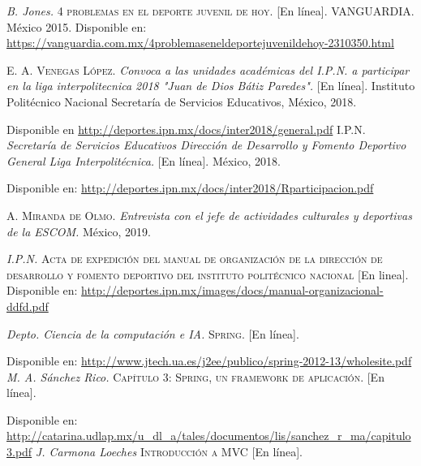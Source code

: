 
\begin{thebibliography}{}
	\textit{B. Jones.}
	\textsc{4 problemas en el deporte juvenil de hoy.} [En línea].
	VANGUARDIA. México 2015.
	\linebreak
	Disponible en: 
	\url{https://vanguardia.com.mx/4problemaseneldeportejuvenildehoy-2310350.html}
	
	\textsc{E. A. Venegas López.}
	\textit{Convoca a las unidades académicas del I.P.N. a participar en la liga interpolitecnica 2018 "Juan de Dios Bátiz Paredes".} [En línea]. Instituto Politécnico Nacional Secretaría de Servicios Educativos, México, 2018.
	
	\linebreak
	Disponible en
	\url{http://deportes.ipn.mx/docs/inter2018/general.pdf}
	\textsc{I.P.N.}
	\textit{Secretaría de Servicios Educativos Dirección de Desarrollo y Fomento Deportivo General Liga Interpolitécnica.}
	[En línea]. México, 2018.
	
	\linebreak
	Disponible en: 
	\url{http://deportes.ipn.mx/docs/inter2018/Rparticipacion.pdf}
	
	\textsc{A. Miranda de Olmo.}
	\textit{Entrevista con el jefe de actividades culturales y deportivas de la ESCOM.} México, 2019.
	
	\linebreak
	
	\textit{I.P.N.}
	\textsc{Acta de expedición del manual de organización de la dirección de desarrollo y fomento deportivo del instituto politécnico nacional} [En linea].
	Disponible en:
	\url{http://deportes.ipn.mx/images/docs/manual-organizacional-ddfd.pdf}
	
	\textit{Depto. Ciencia de la computación e IA.}
	\textsc{Spring.} [En línea]. 
	
	\linebreak
	Disponible en:
	\url{http://www.jtech.ua.es/j2ee/publico/spring-2012-13/wholesite.pdf}
	\textit{M. A. Sánchez Rico.}
	\textsc{Capítulo 3: Spring, un framework de aplicación.} [En línea].
	
	\linebreak
	Disponible en:
	\url{http://catarina.udlap.mx/u_dl_a/tales/documentos/lis/sanchez_r_ma/capitulo3.pdf}
	\textit{J. Carmona Loeches}
	\textsc{Introducción a MVC} [En línea]. 
	

\end{thebibliography}

